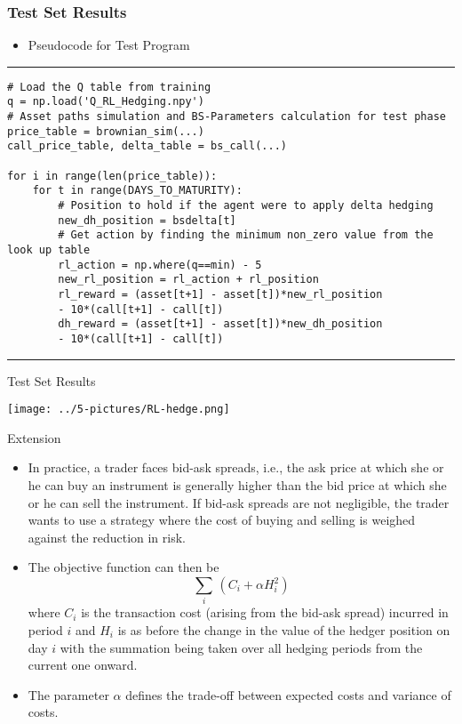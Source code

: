 \documentclass[11pt]{beamer}
\begin{document}
\begin{frame}[fragile]
\frametitle{Test Set Results}
\scriptsize
	\begin{itemize}
		\item Pseudocode for Test Program
	\end{itemize}

\rule{\textwidth}{1pt}
\begin{verbatim}
# Load the Q table from training
q = np.load('Q_RL_Hedging.npy')  
# Asset paths simulation and BS-Parameters calculation for test phase
price_table = brownian_sim(...)
call_price_table, delta_table = bs_call(...)

for i in range(len(price_table)):
    for t in range(DAYS_TO_MATURITY):
        # Position to hold if the agent were to apply delta hedging 
        new_dh_position = bsdelta[t]
        # Get action by finding the minimum non_zero value from the look up table 
        rl_action = np.where(q==min) - 5 
        new_rl_position = rl_action + rl_position 
        rl_reward = (asset[t+1] - asset[t])*new_rl_position 
        - 10*(call[t+1] - call[t])
        dh_reward = (asset[t+1] - asset[t])*new_dh_position 
        - 10*(call[t+1] - call[t])
\end{verbatim}
\rule{\textwidth}{1pt}
\end{frame}
\begin{frame}{Test Set Results}
\begin{center}
\texttt{[image: ../5-pictures/RL-hedge.png]} 
\end{center}
\end{frame}
\begin{frame}{Extension}
	\begin{itemize}
		\item In practice, a trader faces bid-ask spreads, i.e., the ask price at which she or he can buy an instrument is generally higher than the bid price at which she or he can sell the instrument. If bid-ask spreads are not negligible, the trader wants to use a strategy where the cost of buying and selling is weighed against the reduction in risk. 
		\item The objective function can then be $$\sum\limits_i \, \left( C_i + \alpha H_i^2 \right)$$ where $C_i$ is the transaction cost (arising from the bid-ask spread) incurred in period $i$ and $H_i$ is as before the change in the value of the hedger position on day $i$ with the summation being taken over all hedging periods from the current one onward. 
		\item The parameter $\alpha$ defines the trade-off between expected costs and variance of costs.
	\end{itemize}
\end{frame}
\end{document}
